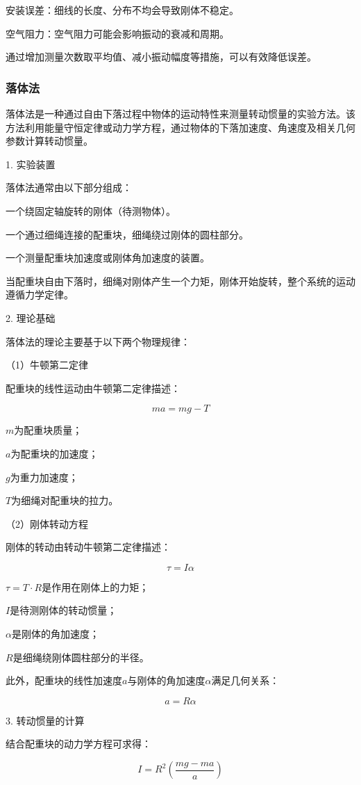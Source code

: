 \documentclass[12pt,hyperref,a4paper,UTF8]{ctexart}
\begin{document}
安装误差：细线的长度、分布不均会导致刚体不稳定。

空气阻力：空气阻力可能会影响振动的衰减和周期。


通过增加测量次数取平均值、减小振动幅度等措施，可以有效降低误差。

\subsubsection{落体法}
落体法是一种通过自由下落过程中物体的运动特性来测量转动惯量的实验方法。该方法利用能量守恒定律或动力学方程，通过物体的下落加速度、角速度及相关几何参数计算转动惯量。

1. 实验装置

落体法通常由以下部分组成：

一个绕固定轴旋转的刚体（待测物体）。

一个通过细绳连接的配重块，细绳绕过刚体的圆柱部分。

一个测量配重块加速度或刚体角加速度的装置。


当配重块自由下落时，细绳对刚体产生一个力矩，刚体开始旋转，整个系统的运动遵循力学定律。

2. 理论基础

落体法的理论主要基于以下两个物理规律：

（1）牛顿第二定律

配重块的线性运动由牛顿第二定律描述：

$$ ma = mg - T $$

 $m$为配重块质量；

 $a$为配重块的加速度；

 $g$为重力加速度；

 $T$为细绳对配重块的拉力。


（2）刚体转动方程

刚体的转动由转动牛顿第二定律描述：

$$  \tau = I \alpha $$

 $\tau=T\cdot R$是作用在刚体上的力矩；

 $I$是待测刚体的转动惯量；

 $\alpha$是刚体的角加速度；

 $R$是细绳绕刚体圆柱部分的半径。


此外，配重块的线性加速度$a$与刚体的角加速度$\alpha$满足几何关系：

$$ a = R \alpha $$

3. 转动惯量的计算

结合配重块的动力学方程可求得：

$$ I = R^2 \left( \frac{m g - m a}{a} \right) $$
\end{document}
